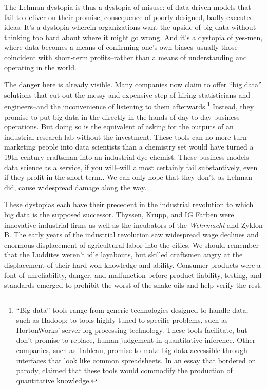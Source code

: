 \documentclass[12pt]{article}
\begin{document}
The Lehman dystopia is thus a dystopia of misuse: of data-driven
models that fail to deliver on their promise, consequence of
poorly-designed, badly-executed ideas. It's a dystopia wherein
organizations want the upside of big data without thinking too hard
about where it might go wrong. And it's a dystopia of yes-men, where
data becomes a means of confirming one's own biases--usually those
coincident with short-term profits--rather than a means of
understanding and operating in the world.

The danger here is already visible.  Many companies now claim to offer
``big data'' solutions that cut out the messy and expensive step of
hiring statisticians and engineers--and the inconvenience of listening
to them afterwards.\footnote{``Big data'' tools range from generic
technologies designed to handle data, such as Hadoop; to tools highly
tuned to specific problems, such as HortonWorks' server log processing
technology. These tools facilitate, but don't promise to replace,
human judgement in quantitative inference. Other companies, such as
Tableau, promise to make big data accessible through interfaces that
look like common spreadsheets. In an essay that bordered on parody,
\cite{mehta2013} claimed that these tools would commodify the
production of quantitative knowledge.} Instead, they promise to put
big data in the directly in the hands of day-to-day business
operations. But doing so is the equivalent of asking for the outputs
of an industrial research lab without the investment. These tools can
no more turn marketing people into data scientists than a chemistry
set would have turned a 19th century craftsman into an industrial dye
chemist. These business models--data science as a service, if you
will--will almost certainly fail substantively, even if they profit in
the short term.. We can only hope that they don't, as Lehman did,
cause widespread damage along the way.

These dystopias each have their precedent in the industrial revolution
to which big data is the supposed successor. Thyssen, Krupp, and IG
Farben were innovative industrial firms as well as the incubators of
the \textit{Wehrmacht} and Zyklon B. The early years of the industrial
revolution saw widespread wage declines and enormous displacement of
agricultural labor into the cities. We should remember that the
Luddites weren't idle layabouts, but skilled craftsmen angry at the
displacement of their hard-won knowledge and ability.  Consumer
products were a font of unreliability, danger, and malfunction before
product liability, testing, and standards emerged to prohibit the
worst of the snake oils and help verify the rest. 
\end{document}
